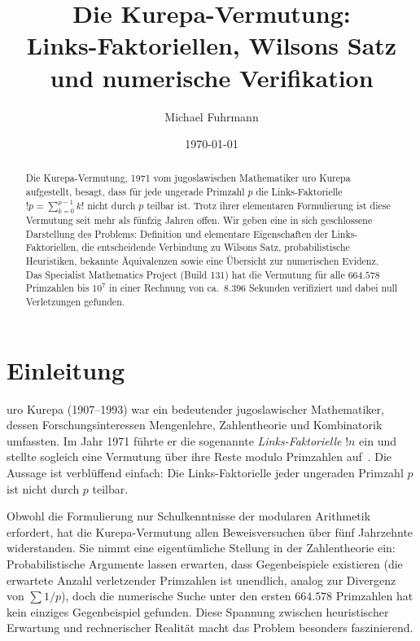 \documentclass[12pt,a4paper]{amsart}
\theoremstyle{definition}
\begin{document}

\title{Die Kurepa-Vermutung:\\
       Links-Faktoriellen, Wilsons Satz\\
       und numerische Verifikation}

\author{Michael Fuhrmann}
\address{Specialist Mathematics Project, Build 133}
\date{\today}

\begin{abstract}
Die Kurepa-Vermutung, 1971 vom jugoslawischen Mathematiker \DJ{}uro Kurepa
aufgestellt, besagt, dass für jede ungerade Primzahl $p$ die Links-Faktori\-elle
$!p = \sum_{k=0}^{p-1} k!$ nicht durch $p$ teilbar ist.
Trotz ihrer elementaren Formulierung ist diese Vermutung seit mehr als
fünfzig Jahren offen.
Wir geben eine in sich geschlossene Darstellung des Problems: Definition und
elementare Eigenschaften der Links-Faktoriellen, die entscheidende Verbindung
zu Wilsons Satz, probabilistische Heuristiken, bekannte Äquivalenzen sowie
eine Übersicht zur numerischen Evidenz.
Das Specialist Mathematics Project (Build 131) hat die Vermutung für alle
$664{.}578$ Primzahlen bis $10^7$ in einer Rechnung von ca.\ $8{.}396$
Sekunden verifiziert und dabei null Verletzungen gefunden.
\end{abstract}

\maketitle
\tableofcontents

\section{Einleitung}

\DJ{}uro Kurepa (1907--1993) war ein bedeutender jugoslawischer Mathematiker,
dessen Forschungsinteressen Mengenlehre, Zahlentheorie und Kombinatorik
umfassten.
Im Jahr 1971 führte er die sogenannte \emph{Links-Faktori\-elle} $!n$ ein
und stellte sogleich eine Vermutung über ihre Reste modulo Primzahlen
auf~\cite{Kurepa1971}.
Die Aussage ist verblüffend einfach: Die Links-Faktori\-elle jeder ungeraden
Primzahl $p$ ist nicht durch $p$ teilbar.

Obwohl die Formulierung nur Schulkenntnisse der modularen Arithmetik erfordert,
hat die Kurepa-Vermutung allen Beweisversuchen über fünf Jahrzehnte widerstanden.
Sie nimmt eine eigentümliche Stellung in der Zahlentheorie ein:
Probabilistische Argumente lassen erwarten, dass Gegenbeispiele existieren
(die erwartete Anzahl verletzender Primzahlen ist unendlich, analog zur
Divergenz von $\sum 1/p$), doch die numerische Suche unter den ersten
$664{.}578$ Primzahlen hat kein einziges Gegenbeispiel gefunden.
Diese Spannung zwischen heuristischer Erwartung und rechnerischer Realität
macht das Problem besonders faszinierend.
\end{document}
